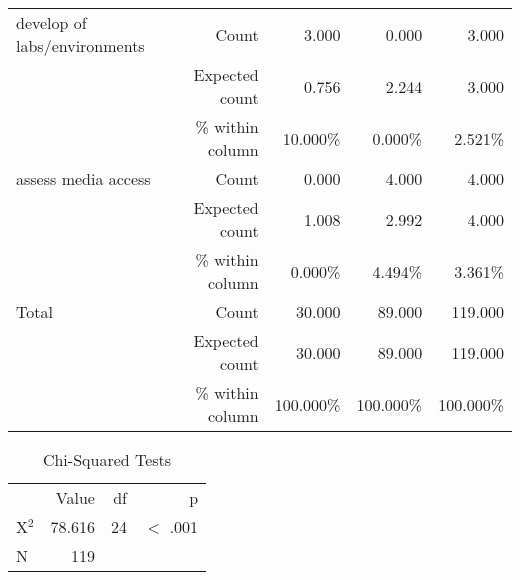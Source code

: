 \documentclass[6pt, oneside]{article}   	%
\begin{document}
\begin{table}[h]
{\begin{tabular}{lrrrr}
			develop of labs/environments & Count & 3.000 & 0.000 & 3.000  \\
			 & Expected count & 0.756 & 2.244 & 3.000  \\
			 &  \% within column & 10.000\% & 0.000\% & 2.521\%  \\
			assess media access & Count & 0.000 & 4.000 & 4.000  \\
			 & Expected count & 1.008 & 2.992 & 4.000  \\
			 &  \% within column & 0.000\% & 4.494\% & 3.361\%  \\
			Total & Count & 30.000 & 89.000 & 119.000  \\
			 & Expected count & 30.000 & 89.000 & 119.000  \\
			 &  \% within column & 100.000\% & 100.000\% & 100.000\%  \\
			\bottomrule
		\end{tabular}
	}
\end{table}


\begin{table}[h]
	\centering
	\caption{Chi-Squared Tests}
	\label{tab:chi-SquaredTests}
	{
		\begin{tabular}{lrrr}
			\toprule
			 & Value & df & p  \\
			\cmidrule[0.4pt]{1-4}
			X$^{2}$ & 78.616 & 24 & $<$ .001  \\
			N & 119 &  &    \\
			\bottomrule
		\end{tabular}
	}
\end{table}
\end{document}

